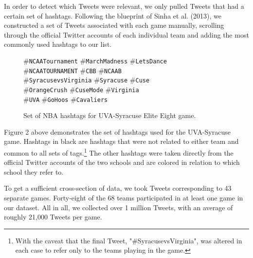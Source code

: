 \documentclass[12pt]{article}
\begin{document}
\begin{doublespacing}
In order to detect which Tweets were relevant, we only pulled Tweets that had a certain set of hashtags. Following the blueprint of Sinha et al. (2013), we constructed a set of Tweets associated with each game manually, scrolling through the official Twitter accounts of each individual team and adding the most commonly used hashtags to our list. 
\vspace{1cm}
\begin{figure} [H]
    \begin{center}
    \#\texttt{NCAATournament} \#\texttt{MarchMadness} \#\texttt{LetsDance} \\ 
    \#\texttt{NCAATOURNAMENT} \#\texttt{CBB} \#\texttt{NCAAB} \\ 
    \#\texttt{SyracusevsVirginia} \textcolor{cuse}{\#\texttt{Syracuse}} \textcolor{cuse}{\#\texttt{Cuse}} \\ 
    \textcolor{cuse}{\#\texttt{OrangeCrush}} \textcolor{cuse}{\#\texttt{CuseMode}} \textcolor{uva}{\#\texttt{Virginia}} \\ 
    \textcolor{uva}{\#\texttt{UVA}} \textcolor{uva}{\#\texttt{GoHoos}} \textcolor{uva}{\#\texttt{Cavaliers}} \\
    \caption{Set of NBA hashtags for UVA-Syracuse Elite Eight game.}
    \end{center}
\end{figure}

Figure 2 above demonstrates the set of hashtags used for the UVA-Syracuse game. Hashtags in black are hashtags that were not related to either team and common to all sets of tags.\footnote{With the caveat that the final Tweet, "\#SyracusevsVirginia", was altered in each case to refer only to the teams playing in the game.} The other hashtags were taken directly from the official Twitter accounts of the two schools and are colored in relation to which school they refer to. 

To get a sufficient cross-section of data, we took Tweets corresponding to 43 separate games. Forty-eight of the 68 teams participated in at least one game in our dataset. All in all, we collected over 1 million Tweets, with an average of roughly 21,000 Tweets per game. 


\end{doublespacing}
\end{document}
